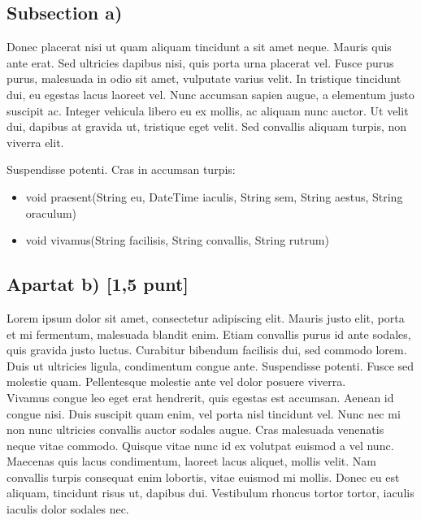 \documentclass{article} %
\begin{document}
\subsection{Subsection a)}
Donec placerat nisi ut quam aliquam tincidunt a sit amet neque. Mauris quis ante erat. Sed ultricies dapibus nisi, quis porta urna placerat vel. Fusce purus purus, malesuada in odio sit amet, vulputate varius velit. In tristique tincidunt dui, eu egestas lacus laoreet vel. Nunc accumsan sapien augue, a elementum justo suscipit ac. Integer vehicula libero eu ex mollis, ac aliquam nunc auctor. Ut velit dui, dapibus at gravida ut, tristique eget velit. Sed convallis aliquam turpis, non viverra elit. 
\\

{\color{blue}
	\renewcommand\labelitemi{}

	Suspendisse potenti. Cras in accumsan turpis:
	{\selectfont\small
	\begin{itemize}
		\item void praesent(String eu, DateTime iaculis, String sem, String aestus, String oraculum)
		\item void vivamus(String facilisis, String convallis, String rutrum)
	\end{itemize}
	}
}

\subsection{Apartat b) [1,5 punt]}
Lorem ipsum dolor sit amet, consectetur adipiscing elit. Mauris justo elit, porta et mi fermentum, malesuada blandit enim. Etiam convallis purus id ante sodales, quis gravida justo luctus. Curabitur bibendum facilisis dui, sed commodo lorem. Duis ut ultricies ligula, condimentum congue ante. Suspendisse potenti. Fusce sed molestie quam. Pellentesque molestie ante vel dolor posuere viverra. 
\\

Vivamus congue leo eget erat hendrerit, quis egestas est accumsan. Aenean id congue nisi. Duis suscipit quam enim, vel porta nisl tincidunt vel. Nunc nec mi non nunc ultricies convallis auctor sodales augue. Cras malesuada venenatis neque vitae commodo. Quisque vitae nunc id ex volutpat euismod a vel nunc. Maecenas quis lacus condimentum, laoreet lacus aliquet, mollis velit. Nam convallis turpis consequat enim lobortis, vitae euismod mi mollis. Donec eu est aliquam, tincidunt risus ut, dapibus dui. Vestibulum rhoncus tortor tortor, iaculis iaculis dolor sodales nec.
\end{document}
